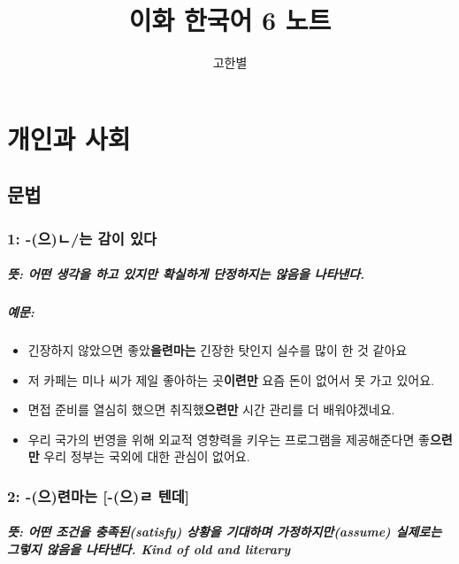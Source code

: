 \documentclass[a4paper, 11pt, oneside]{book}
\begin{document}
\setcounter{secnumdepth}{0}
\begin{titlepage}
\title{\Huge 이화 한국어 6 노트}
\author{\Large 고한별}
\date{}
\maketitle
\end{titlepage}

\pagebreak

\chapter{개인과 사회}
\section{문법}

\subsection{1: -(으)ㄴ/는 감이 있다}
\paragraph{뜻: 어떤 생각을 하고 있지만 확실하게 단정하지는 않음을 나타낸다.}
\paragraph{예문:}
\begin{itemize}
	\item 긴장하지 않았으면 좋았\textbf{을련마는} 긴장한 탓인지 실수를 많이 한 것 같아요 
	\item 저 카페는 미나 씨가 제일 좋아하는 곳\textbf{이련만} 요즘 돈이 없어서 못 가고 있어요.
	\item 면접 준비를 열심히 했으면 취직했\textbf{으련만} 시간 관리를 더 배워야겠네요. 
	\item 우리 국가의 번영을 위해 외교적 영향력을 키우는 프로그램을 제공해준다면 좋\textbf{으련만} 우리 정부는 국외에 대한 관심이 없어요.   
\end{itemize}

\subsection{2: -(으)련마는 [-(으)ㄹ 텐데]}
\paragraph{뜻: 어떤 조건을 충족된(satisfy) 상황을 기대하며 가정하지만(assume) 실제로는 그렇지 않음을 나타낸다. Kind of old and literary}
\end{document}
